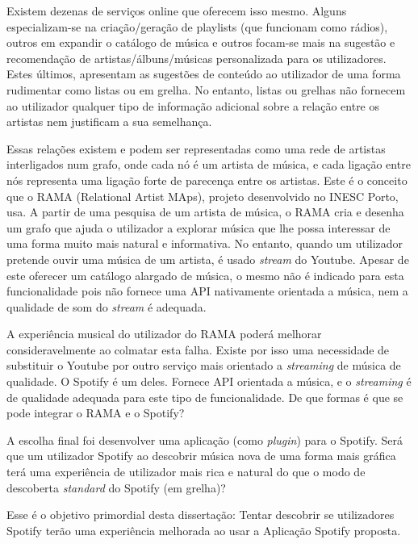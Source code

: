 Existem dezenas de serviços online que oferecem isso mesmo.
Alguns especializam-se na criação/geração de playlists (que funcionam como rádios), outros em expandir o catálogo de música e outros focam-se mais na sugestão e recomendação de artistas/álbuns/músicas personalizada para os utilizadores.
Estes últimos, apresentam as sugestões de conteúdo ao utilizador de uma forma rudimentar como listas ou em grelha.
No entanto, listas ou grelhas não fornecem ao utilizador qualquer tipo de informação adicional sobre a relação entre os artistas nem justificam a sua semelhança.

Essas relações existem e podem ser representadas como uma rede de artistas interligados num grafo, onde cada nó é um artista de música, e cada ligação entre nós representa uma ligação forte de parecença entre os artistas.
Este é o conceito que o RAMA (Relational Artist MAps), projeto desenvolvido no INESC Porto, usa.
A partir de uma pesquisa de um artista de música, o RAMA cria e desenha um grafo que ajuda o utilizador a explorar música que lhe possa interessar de uma forma muito mais natural e informativa.
No entanto, quando um utilizador pretende ouvir uma música de um artista, é usado \emph{stream} do Youtube. 
Apesar de este oferecer um catálogo alargado de música, o mesmo não é indicado para esta funcionalidade pois não fornece uma API nativamente orientada a música, nem a qualidade de som do \emph{stream} é adequada.

A experiência musical do utilizador do RAMA poderá melhorar consideravelmente ao colmatar esta falha.
Existe por isso uma necessidade de substituir o Youtube por outro serviço mais orientado a \emph{streaming} de música de qualidade.
O Spotify é um deles. Fornece API orientada a música, e o \emph{streaming} é de qualidade adequada para este tipo de funcionalidade.
De que formas é que se pode integrar o RAMA e o Spotify?

A escolha final foi desenvolver uma aplicação (como \emph{plugin}) para o Spotify.
Será que um utilizador Spotify ao descobrir música nova de uma forma mais gráfica terá uma experiência de utilizador mais rica e natural do que o modo de descoberta \emph{standard} do Spotify (em grelha)?

Esse é o objetivo primordial desta dissertação: Tentar descobrir se utilizadores Spotify terão uma experiência melhorada ao usar a Aplicação Spotify proposta.
